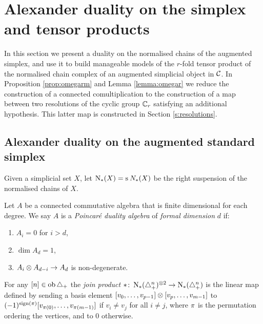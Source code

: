 
\section{Alexander duality on the simplex and tensor products}\label{s:3complexes}

In this section we present a duality on the normalised chains of the augmented simplex, and use it to build manageable models of the $r$-fold tensor product of the normalised chain complex of an augmented simplicial object in $\mathcal{C}$. In Proposition \ref{prop:omegarm} and Lemma \ref{lemma:omegar} we reduce the construction of a connected comultiplication to the construction of a map between two resolutions of the cyclic group $\mathbb{C}_r$ satisfying an additional hypothesis. This latter map is constructed in Section \ref{s:resolutions}.

\subsection{Alexander duality on the augmented standard simplex}\label{s:alexander}
Given a simplicial set $X$, let $\operatorname{N}_{*}(X) = \operatorname{s}^{}N_{*}(X)$ be the right suspension of the normalised chains of $X$.


 

\begin{definition}\label{d:poincare_duality_algebra}
	Let $A$ be a connected commutative algebra that is finite dimensional for each degree.
	We say $A$ is a \textit{Poincar\'e duality algebra} of \textit{formal dimension} $d$ if:
	\begin{enumerate}
		\item\label{i:pd1} $A_i = 0$ for $i > d$,
		\item\label{i:pd2} $\dim A_d = 1$,
		\item\label{i:pd3} $A_i \otimes A_{d-i} \to A_d$ is non-degenerate.
	\end{enumerate}
\end{definition}

\begin{definition}\label{d:join_product}
	For any $[n] \in \operatorname{ob}\triangle_{+}$ the \textit{join product} $\ast \colon \operatorname{N}_{*}(\triangle_{+}^{n})^{\otimes 2} \to \operatorname{N}_{*}(\triangle_{+}^{n})$ is the linear map defined by sending a basis element $[v_0, \dots, v_{p-1}] \otimes [v_{p},\dots,v_{m-1}]$ to $(-1)^{\operatorname{sign}(\pi)}[v_{\pi(0)}, \dots, v_{\pi(m-1)}]$	if $v_i \neq v_j$ for all $i \neq j$, where $\pi$ is the permutation ordering the vertices, and to $0$ otherwise.
\end{definition}

